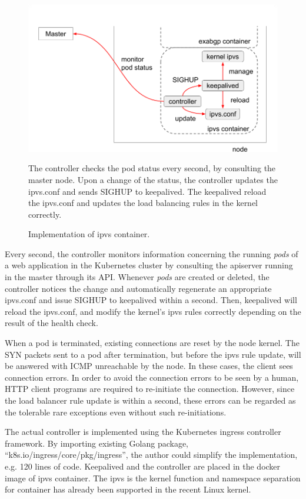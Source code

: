 \begin{figure}[h]
  \begin{center}
    \includegraphics[width=0.8\columnwidth]{Figs/ipvs-ingress-schem}
    \caption{Implementation of ipvs container.}
    \label{fig:IPVS-ingress-schem}

    \parbox[c]{0.9\columnwidth}{
      The controller checks the pod status every second, by consulting the master node.
      Upon a change of the status, the controller updates the ipvs.conf and sends SIGHUP to keepalived.
      The keepalived reload the ipvs.conf and updates the load balancing rules in the kernel correctly.
    }
  \end{center}

\end{figure}

Every second, the controller monitors information concerning the running {\em pods} of a web application in the Kubernetes cluster by consulting the apiserver running in the master through its API.
Whenever {\em pods} are created or deleted, the controller notices the change and automatically regenerate an appropriate ipvs.conf 
and issue SIGHUP to keepalived within a second.
Then, keepalived will reload the ipvs.conf, and modify the kernel's ipvs rules correctly depending on the result of the health check.

When a pod is terminated, existing connections are reset by the node kernel.
The SYN packets sent to a pod after termination, but before the ipvs rule update, will be answered with ICMP unreachable by the node.
In these cases, the client sees connection errors.
In order to avoid the connection errors to be seen by a human, HTTP client programs are required to re-initiate the connection.
However, since the load balancer rule update is within a second, these errors can be regarded as the tolerable rare exceptions even without such re-initiations.

The actual controller\cite{ktaka_ccmp_2017_826894} is implemented using the Kubernetes ingress controller\cite{K8sIngress2017} framework. 
By importing existing Golang package, \enquote{k8s.io/ingress/core/pkg/ingress}, the author could simplify the implementation, e.g. 
120 lines of code.  
%
Keepalived and the controller are placed in the docker image of ipvs container.
The ipvs is the kernel function and namespace separation for container has already been supported in the recent Linux kernel. 

